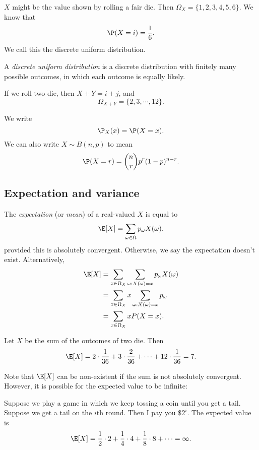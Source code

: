 \documentclass[a4paper]{article}
\begin{document}
\begin{eg}
  $X$ might be the value shown by rolling a fair die. Then $\Omega_X = \{1, 2, 3, 4, 5, 6\}$. We know that
  \[
    \P(X = i) = \frac{1}{6}.
  \]
  We call this the discrete uniform distribution.
\end{eg}
\begin{defi}
  A \emph{discrete uniform distribution} is a discrete distribution with finitely many possible outcomes, in which each outcome is equally likely.
\end{defi}

\begin{eg}
  If we roll two die, then $X + Y = i + j$, and
  \[
    \Omega_{X + Y} = \{2, 3, \cdots, 12\}.
  \]
\end{eg}

\begin{notation}
  We write
  \[
    \P_X(x) = \P(X = x).
  \]
  We can also write $X\sim B(n, p)$ to mean
  \[
    \P(X = r) = \binom{n}{r}p^r(1 - p)^{n - r}.
  \]
\end{notation}

\subsection{Expectation and variance}
\begin{defi}[Expectation]
  The \emph{expectation} (or \emph{mean}) of a real-valued $X$ is equal to
  \[
    \E[X] = \sum_{\omega\in \Omega}p_\omega X(\omega).
  \]
  provided this is absolutely convergent. Otherwise, we say the expectation doesn't exist. Alternatively, 
  \begin{align*} 
    \E[X] &= \sum_{x\in \Omega_X}\sum_{\omega: X(\omega) = x}p_\omega X(\omega)\\
    &= \sum_{x\in \Omega_X}x\sum_{\omega:X(\omega) = x}p_\omega\\
    &= \sum_{x\in \Omega_X}xP(X = x).
  \end{align*}
\end{defi}
\begin{eg}
  Let $X$ be the sum of the outcomes of two die. Then
  \[
    \E[X] = 2\cdot \frac{1}{36} + 3\cdot \frac{2}{36} + \cdots + 12\cdot \frac{1}{36} = 7.
  \]
\end{eg}
Note that $\E[X]$ can be non-existent if the sum is not absolutely convergent. However, it is possible for the expected value to be infinite:

\begin{eg}
  Suppose we play a game in which we keep tossing a coin until you get a tail. Suppose we get a tail on the $i$th round. Then I pay you $\$2^i$. The expected value is
  \[ \E[X] = \frac{1}{2}\cdot 2 + \frac{1}{4}\cdot 4 + \frac{1}{8}\cdot 8 + \cdots = \infty.
  \]
\end{eg}
\end{document}
